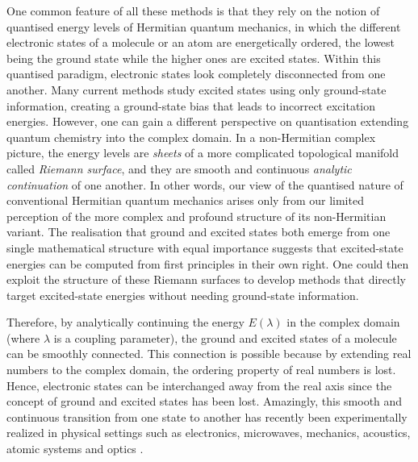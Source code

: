 \documentclass[11pt,a4paper]{article}
\begin{document}
One common feature of all these methods is that they rely on the notion of quantised energy levels of Hermitian quantum mechanics, in which the different electronic states of a molecule or an atom are energetically ordered, the lowest being the ground state while the higher ones are excited states. 
Within this quantised paradigm, electronic states look completely disconnected from one another.
Many current methods study excited states using only ground-state information, creating a ground-state bias that leads to incorrect excitation energies.
However, one can gain a different perspective on quantisation extending quantum chemistry into the complex domain.
In a non-Hermitian complex picture, the energy levels are \textit{sheets} of a more complicated topological manifold called \textit{Riemann surface}, and they are smooth and continuous \textit{analytic continuation} of one another.
In other words, our view of the quantised nature of conventional Hermitian quantum mechanics arises only from our limited perception of the more complex and profound structure of its non-Hermitian variant.
The realisation that ground and excited states both emerge from one single mathematical structure with equal importance suggests that excited-state energies can be computed from first principles in their own right.
One could then exploit the structure of these Riemann surfaces to develop methods that directly target excited-state energies without needing ground-state information.

Therefore, by analytically continuing the energy $E(\lambda)$ in the complex domain (where $\lambda$ is a coupling parameter), the ground and excited states of a molecule can be smoothly connected.
This connection is possible because by extending real numbers to the complex domain, the ordering property of real numbers is lost.
Hence, electronic states can be interchanged away from the real axis since the concept of ground and excited states has been lost.
Amazingly, this smooth and continuous transition from one state to another has recently been experimentally realized in physical settings such as electronics, microwaves, mechanics, acoustics, atomic systems and optics \cite{Bittner_2012, Chong_2011, Chtchelkatchev_2012, Doppler_2016, Guo_2009, Hang_2013, Liertzer_2012, Longhi_2010, Peng_2014, Peng_2014a, Regensburger_2012, Ruter_2010, Schindler_2011, Szameit_2011, Zhao_2010, Zheng_2013, Choi_2018, El-Ganainy_2018}.
\end{document}
